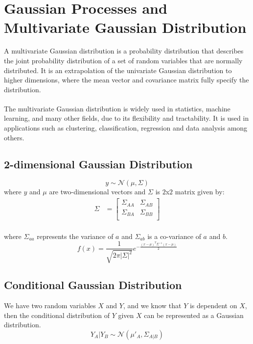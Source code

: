 \documentclass[12pt]{article}
\begin{document}
\section{Gaussian Processes and Multivariate Gaussian Distribution}
A multivariate Gaussian distribution is a probability distribution that describes the joint probability distribution of a set of random variables that are normally distributed. It is an extrapolation of the univariate Gaussian distribution to higher dimensions, where the mean vector and covariance matrix fully specify the distribution.\\
\\
The multivariate Gaussian distribution is widely used in statistics, machine learning, and many other fields, due to its flexibility and tractability. It is used in applications such as clustering, classification, regression and data analysis among others.\\

\subsection{2-dimensional Gaussian Distribution}

\begin{equation}
    y \sim \mathcal{N}(\mu,\Sigma)
\end{equation}
where $y$ and $\mu$ are two-dimensional vectors and $\Sigma$ is $2$x$2$ matrix given by:
\begin{align}
    \Sigma &= \begin{bmatrix}
            \Sigma_{AA} & \Sigma_{AB}\\
            \Sigma_{BA} & \Sigma_{BB}\\
        \end{bmatrix}
\end{align}
\\
where $\Sigma_{aa}$ represents the variance of $a$ and $\Sigma_{ab}$ is a co-variance of $a$ and $b$.\\
\begin{equation}
    f(x) = \frac{1}{\sqrt{2\pi|\Sigma|^2}}e^{-\frac{(x-\mu)^T\Sigma^{-1}(x-\mu)}{2}}
\end{equation}
\subsection{Conditional Gaussian Distribution}
 We have two random variables $X$ and $Y$, and we know that $Y$ is dependent on $X$, then the conditional distribution of $Y$ given $X$ can be represented as a Gaussian distribution.\\
 \begin{equation}
      Y_A|Y_B \sim \mathcal{N}(\mu'_A,\Sigma_{A|B})
 \end{equation}
\end{document}
